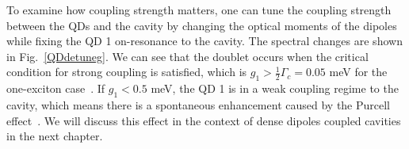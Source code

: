 To examine how coupling strength matters, one can tune the coupling strength between the QDs and the cavity by changing the optical moments of the dipoles while fixing the QD 1 on-resonance to the cavity. The spectral changes are shown in Fig.~\ref{QDdetuneg}. We can see that the doublet occurs when the critical condition for strong coupling is satisfied, which is $g_1>\frac{1}{2}\Gamma_c=0.05$ meV for the one-exciton case~\cite{Kimble1998}. If $g_1<0.5$ meV, the QD 1 is in a weak coupling regime to the cavity, which means there is a spontaneous enhancement caused by the Purcell effect~\cite{Purcell1946,G'erard1998}. We will discuss this effect in the context of dense dipoles coupled cavities in the next chapter.



%
%
%
%
